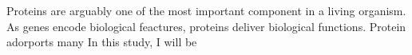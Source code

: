 Proteins are arguably one of the most important component in a living organism. As genes encode biological feactures, proteins deliver biological functions. Protein adorports many  In this study, I will be 
